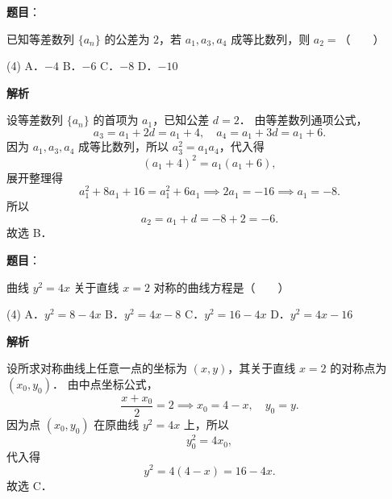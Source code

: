 \begin{answer}

\textbf{题目}：

已知等差数列 $\{a_n\}$ 的公差为 $2$，若 $a_1, a_3, a_4$ 成等比数列，则 $a_2 =$\mbox{（　　）}

\begin{gkopts}(4)
\task A．$-4$
\task B．$-6$
\task C．$-8$
\task D．$-10$
\end{gkopts}

\textbf{解析}

设等差数列 $\{a_n\}$ 的首项为 $a_1$，已知公差 $d = 2$．
由等差数列通项公式，
\nopagebreak[4]
\[
a_3 = a_1 + 2d = a_1 + 4, \quad a_4 = a_1 + 3d = a_1 + 6.
\]
因为 $a_1, a_3, a_4$ 成等比数列，所以 $a_3^2 = a_1 a_4$，代入得
\nopagebreak[4]
\[
(a_1 + 4)^2 = a_1 (a_1 + 6),
\]
展开整理得
\nopagebreak[4]
\[
a_1^2 + 8a_1 + 16 = a_1^2 + 6a_1 \implies 2a_1 = -16 \implies a_1 = -8.
\]
所以
\nopagebreak[4]
\[
a_2 = a_1 + d = -8 + 2 = -6.
\]
故选 B．


\end{answer}
\begin{answer}

\textbf{题目}：

曲线 $y^2 = 4x$ 关于直线 $x = 2$ 对称的曲线方程是\mbox{（　　）}

\begin{gkopts}(4)
\task A．$y^2 = 8 - 4x$
\task B．$y^2 = 4x - 8$
\task C．$y^2 = 16 - 4x$
\task D．$y^2 = 4x - 16$
\end{gkopts}

\textbf{解析}

设所求对称曲线上任意一点的坐标为 $(x, y)$，其关于直线 $x = 2$ 的对称点为 $(x_0, y_0)$．
由中点坐标公式，
\nopagebreak[4]
\[
\frac{x + x_0}{2} = 2 \implies x_0 = 4 - x, \quad y_0 = y.
\]
因为点 $(x_0, y_0)$ 在原曲线 $y^2 = 4x$ 上，所以
\nopagebreak[4]
\[
y_0^2 = 4x_0,
\]
代入得
\nopagebreak[4]
\[
y^2 = 4(4 - x) = 16 - 4x.
\]
故选 C．


\end{answer}
